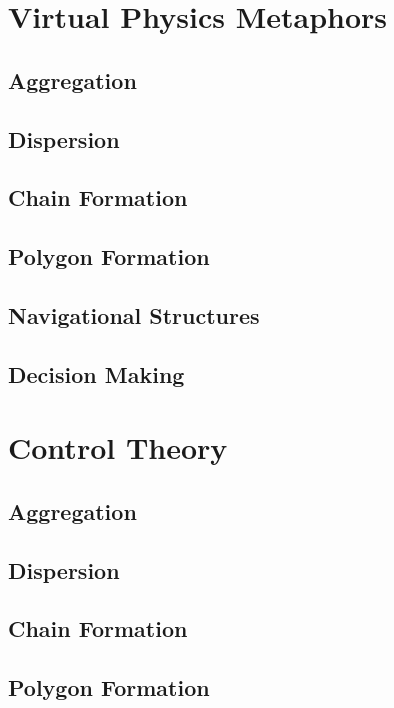 \documentclass[]{article}
\begin{document}
\section{Virtual Physics Metaphors}

\subsection{Aggregation}

\subsection{Dispersion}

\subsection{Chain Formation}

\subsection{Polygon Formation}

\subsection{Navigational Structures}

\subsection{Decision Making}

\section{Control Theory}

\subsection{Aggregation}

\subsection{Dispersion}

\subsection{Chain Formation}

\subsection{Polygon Formation}
\end{document}
